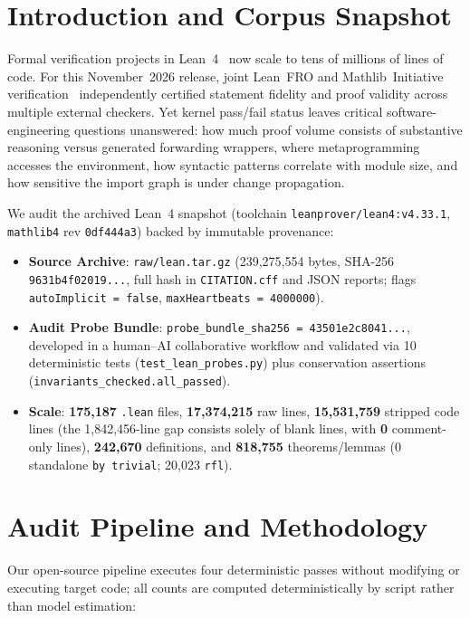 \documentclass[10pt,twocolumn]{article}
\newcommand{\archiveShaShort}{9631b4f02019}
\newcommand{\probeShaShort}{43501e2c8041}
\newcommand{\ub}{\_\allowbreak}
\begin{document}
\section{Introduction and Corpus Snapshot}
Formal verification projects in Lean~4~\cite{Moura_2021} now scale to tens of millions of lines of code. For this November~2026 release, joint Lean~FRO and Mathlib~Initiative verification~\cite{LeanFRO_2026} independently certified statement fidelity and proof validity across multiple external checkers. Yet kernel pass/fail status leaves critical software-engineering questions unanswered: how much proof volume consists of substantive reasoning versus generated forwarding wrappers, where metaprogramming accesses the environment, how syntactic patterns correlate with module size, and how sensitive the import graph is under change propagation.

We audit the archived Lean~4 snapshot (toolchain \texttt{leanprover/lean4:v4.33.1}, \texttt{mathlib4} rev \texttt{0df444a3}) backed by immutable provenance:
\begin{itemize}\setlength{\itemsep}{1pt}\setlength{\parskip}{0pt}\setlength{\topsep}{2pt}
  \item \textbf{Source Archive}: \texttt{raw/lean.tar.gz} (239,275,554 bytes, SHA-256 \texttt{\archiveShaShort...}, full hash in \texttt{CITATION.cff} and JSON reports; flags \texttt{autoImplicit = false}, \texttt{maxHeartbeats = 4000000}).
  \item \textbf{Audit Probe Bundle}: \texttt{probe\ub bundle\ub sha256 = \probeShaShort...}, developed in a human--AI collaborative workflow and validated via 10 deterministic tests (\texttt{test\ub lean\ub probes.py}) plus conservation assertions (\texttt{invariants\ub checked.all\ub passed}).
  \item \textbf{Scale}: \textbf{175,187} \texttt{.lean} files, \textbf{17,374,215} raw lines, \textbf{15,531,759} stripped code lines (the 1,842,456-line gap consists solely of blank lines, with \textbf{0} comment-only lines), \textbf{242,670} definitions, and \textbf{818,755} theorems/lemmas (0 standalone \texttt{by trivial}; 20,023 \texttt{rfl}).
\end{itemize}

\section{Audit Pipeline and Methodology}
Our open-source pipeline executes four deterministic passes without modifying or executing target code; all counts are computed deterministically by script rather than model estimation:
\end{document}
